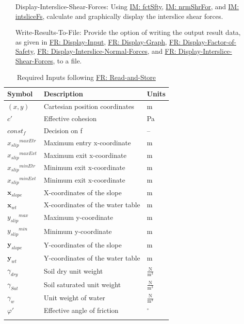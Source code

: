 \documentclass[12pt]{article}
\begin{document}
\begin{itemize}
\item[Display-Interslice-Shear-Forces:\phantomsection\label{displayShear}]Using \hyperref[IM:fctSfty]{IM: fctSfty}, \hyperref[IM:nrmShrFor]{IM: nrmShrFor}, and \hyperref[IM:intsliceFs]{IM: intsliceFs}, calculate and graphically display the interslice shear forces.
\item[Write-Results-To-File:\phantomsection\label{writeToFile}]Provide the option of writing the output result data, as given in \hyperref[displayInput]{FR: Display-Input}, \hyperref[displayGraph]{FR: Display-Graph}, \hyperref[displayFS]{FR: Display-Factor-of-Safety}, \hyperref[displayNormal]{FR: Display-Interslice-Normal-Forces}, and \hyperref[displayShear]{FR: Display-Interslice-Shear-Forces}, to a file.
\end{itemize}
\begin{longtable}{l l l}
\toprule
\textbf{Symbol} & \textbf{Description} & \textbf{Units}
\\
\midrule
\endhead
$(x,y)$ & Cartesian position coordinates & m
\\
$c'$ & Effective cohesion & Pa
\\
$const_f$ & Decision on f & --
\\
${{x_{slip}}^{maxEtr}}$ & Maximum entry x-coordinate & m
\\
${{x_{slip}}^{maxExt}}$ & Maximum exit x-coordinate & m
\\
${{x_{slip}}^{minEtr}}$ & Minimum exit x-coordinate & m
\\
${{x_{slip}}^{minExt}}$ & Minimum exit x-coordinate & m
\\
${\mathbf{x}_{slope}}$ & X-coordinates of the slope & m
\\
${\mathbf{x}_{wt}}$ & X-coordinates of the water table & m
\\
${{y_{slip}}^{max}}$ & Maximum y-coordinate & m
\\
${{y_{slip}}^{min}}$ & Minimum y-coordinate & m
\\
${\mathbf{y}_{slope}}$ & Y-coordinates of the slope & m
\\
${\mathbf{y}_{wt}}$ & Y-coordinates of the water table & m
\\
${γ_{dry}}$ & Soil dry unit weight & $\frac{\text{N}}{\text{m}^{3}}$
\\
${γ_{Sat}}$ & Soil saturated unit weight & $\frac{\text{N}}{\text{m}^{3}}$
\\
${γ_{w}}$ & Unit weight of water & $\frac{\text{N}}{\text{m}^{3}}$
\\
$φ'$ & Effective angle of friction & ${}^{\circ}$
\\
\bottomrule
\caption{Required Inputs following \hyperref[readAndStore]{FR: Read-and-Store}}
\label{Table:ReqInputs}
\end{longtable}
\end{document}
